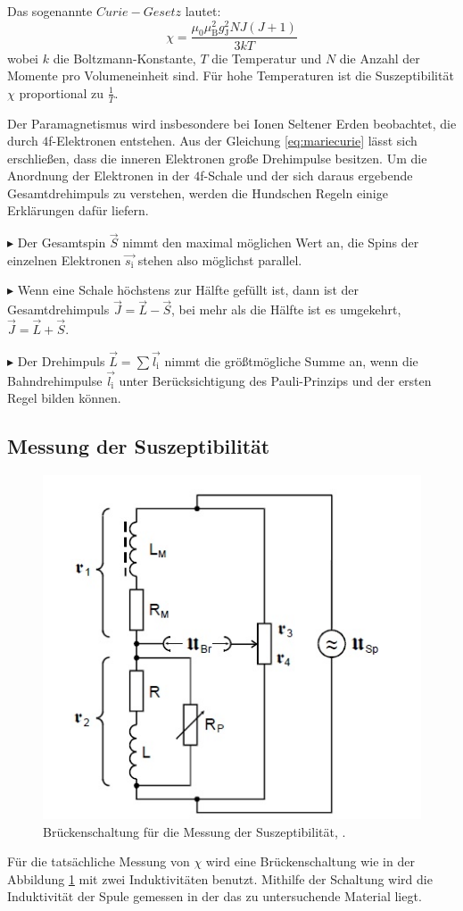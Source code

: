 Das sogenannte $\mathit{Curie-Gesetz}$ lautet:
\begin{equation}
\label{eq:mariecurie}
\chi = \frac{\mu_0\mu_\text{B}^{2}g_\text{J}^{2}NJ(J+1)}{3kT}
\end{equation}
wobei $k$ die Boltzmann-Konstante, $T$ die Temperatur und $N$ die Anzahl der Momente pro Volumeneinheit sind. Für hohe Temperaturen ist die Suszeptibilität $\chi$ proportional zu $\frac{1}{T}$.

Der Paramagnetismus wird insbesondere bei Ionen Seltener Erden beobachtet, die durch $4$f-Elektronen entstehen. Aus der Gleichung \ref{eq:mariecurie} lässt sich erschließen, dass die inneren Elektronen große Drehimpulse besitzen. Um die Anordnung der Elektronen in der $4$f-Schale und der sich daraus ergebende Gesamtdrehimpuls zu verstehen, werden die Hundschen Regeln einige Erklärungen dafür liefern. 

$\blacktriangleright$ Der Gesamtspin $\vec{S}$ nimmt den maximal möglichen Wert an, die Spins der einzelnen Elektronen $\vec{s_\text{i}}$ stehen also möglichst parallel. 

$\blacktriangleright$ Wenn eine Schale höchstens zur Hälfte gefüllt ist, dann ist der Gesamtdrehimpuls $\vec{J} = \vec{L} - \vec{S}$, bei mehr als die Hälfte ist es umgekehrt, $\vec{J} = \vec{L} + \vec{S}$.

$\blacktriangleright$ Der Drehimpuls $\vec{L} = \sum \vec{l_\text{i}}$ nimmt die größtmögliche Summe an, wenn die Bahndrehimpulse $\vec{l_\text{i}}$ unter Berücksichtigung des Pauli-Prinzips und der ersten Regel bilden können.

\subsection{Messung der Suszeptibilität}
\begin{figure}[h!]
	\centering
	\includegraphics[width=0.7\linewidth]{bruckenschaltung.jpg}
	\caption{Brückenschaltung für die Messung der Suszeptibilität, \cite[8]{anleitung606}.}
	\label{fig:bruckenschaltung}
\end{figure}
Für die tatsächliche Messung von $\chi$ wird eine Brückenschaltung wie in der Abbildung \ref{fig:bruckenschaltung} mit zwei Induktivitäten benutzt. Mithilfe der Schaltung wird die Induktivität der Spule gemessen in der das zu untersuchende Material liegt.

